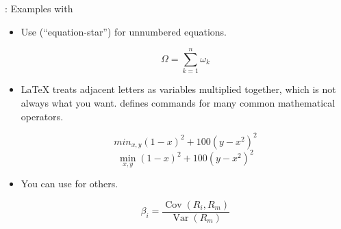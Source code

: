 \documentclass{beamer}
\begin{document}
\begin{frame}[fragile]{\insertsubsection{}: Examples with }
\begin{itemize}
\item Use  (``equation-star'') for unnumbered equations.
\begin{exampletwouptiny}
\begin{equation*}
  \Omega = \sum_{k=1}^{n} \omega_k
\end{equation*}
\end{exampletwouptiny}
\item \LaTeX{} treats adjacent letters as variables multiplied together, which
is not always what you want.  defines commands for many common
mathematical operators.
\begin{exampletwouptiny}
\begin{equation*} %
 min_{x,y} (1-x)^2 + 100(y-x^2)^2
\end{equation*}
\begin{equation*} %
\min_{x,y}{(1-x)^2 + 100(y-x^2)^2}
\end{equation*}
\end{exampletwouptiny}
\item You can use  for others.
\begin{exampletwouptiny}
\begin{equation*}
\beta_i =
\frac{\operatorname{Cov}(R_i, R_m)}
     {\operatorname{Var}(R_m)}
\end{equation*}
\end{exampletwouptiny}
\end{itemize}
\end{frame}
\end{document}
